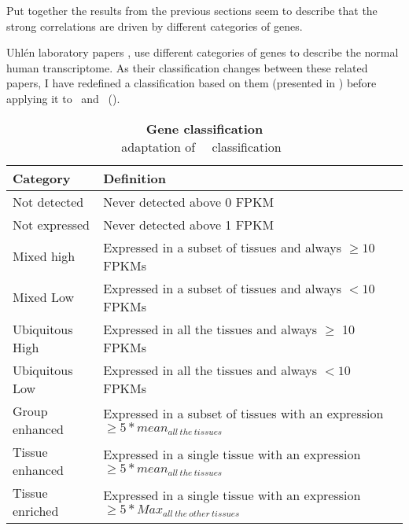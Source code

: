 Put together the results from the previous sections seem to describe that
the strong correlations are driven by different categories of genes.

Uhlén laboratory papers ,
use different categories of genes to describe the normal human transcriptome.
As their classification changes between these related papers,
I have redefined a classification based on them
(presented in )
before applying it to \setOne\ and \setTwo\ ().

\begin{table}[!htpb]
\centering
\caption[Gene classification]{\textbf{Gene classification}\label{tab:UhlenCat}\\
\footnotesize{adaptation of \uhlen\ \etal\ classification~}}
\begin{tabular}{@{}ll@{}}
\toprule
Category        & Definition                                                                                           \\ \midrule
Not detected    & Never detected above 0 FPKM                                                                    \\
Not expressed   & Never detected above 1 FPKM                                                                    \\
Mixed high      & Expressed in a subset of tissues and always $\geq 10$ FPKMs                                     \\
Mixed Low       & Expressed in a subset of tissues and always $< 10$ FPKMs                                 \\
Ubiquitous High & Expressed in all the tissues and always $\geq$ 10 FPKMs                                         \\
Ubiquitous Low  & Expressed in all the tissues and always $< 10$ FPKMs                                     \\
Group enhanced  & Expressed in a subset of tissues with an expression $\geq 5*mean_{all~the~tissues}$             \\
Tissue enhanced & Expressed in a single tissue with an expression $\geq 5*mean_{all~the~tissues}$                 \\
Tissue enriched & Expressed in a single tissue with an expression $\geq 5*Max_{all~the~other~tissues}$ \\ \bottomrule
\end{tabular}
\end{table}

